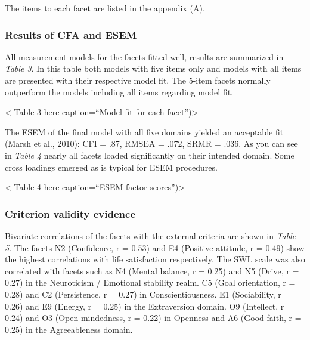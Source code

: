 \documentclass[,man]{apa6}
\theoremstyle{definition}
\theoremstyle{definition}
\theoremstyle{definition}
\theoremstyle{remark}
\begin{document}
The items to each facet are listed in the appendix (A).

\hypertarget{results-of-cfa-and-esem}{%
\subsubsection{Results of CFA and ESEM}\label{results-of-cfa-and-esem}}

All measurement models for the facets fitted well, results are
summarized in \emph{Table 3}. In this table both models with five items
only and models with all items are presented with their respective model
fit. The 5-item facets normally outperform the models including all
items regarding model fit.

\vspace{5mm}

\textless{} Table 3 here caption=\enquote{Model fit for each
facet})\textgreater{}

\vspace{5mm}

The ESEM of the final model with all five domains yielded an acceptable
fit (Marsh et al., 2010): CFI = .87, RMSEA = .072, SRMR = .036. As you
can see in \emph{Table 4} nearly all facets loaded significantly on
their intended domain. Some cross loadings emerged as is typical for
ESEM procedures.

\vspace{5mm}

\textless{} Table 4 here caption=\enquote{ESEM factor
scores})\textgreater{}

\vspace{5mm}

\hypertarget{criterion-validity-evidence-1}{%
\subsubsection{Criterion validity
evidence}\label{criterion-validity-evidence-1}}

Bivariate correlations of the facets with the external criteria are
shown in \emph{Table 5}. The facets N2 (Confidence, r = 0.53) and E4
(Positive attitude, r = 0.49) show the highest correlations with life
satisfaction respectively. The SWL scale was also correlated with facets
such as N4 (Mental balance, r = 0.25) and N5 (Drive, r = 0.27) in the
Neuroticism / Emotional stability realm. C5 (Goal orientation, r = 0.28)
and C2 (Persistence, r = 0.27) in Conscientiousness. E1 (Sociability, r
= 0.26) and E9 (Energy, r = 0.25) in the Extraversion domain. O9
(Intellect, r = 0.24) and O3 (Open-mindedness, r = 0.22) in Openness and
A6 (Good faith, r = 0.25) in the Agreeableness domain.
\end{document}
